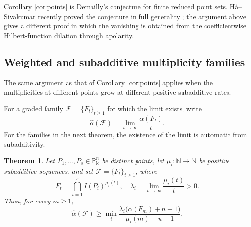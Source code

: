 \documentclass[11pt]{amsart}
\newtheorem{theorem}{Theorem}[section]
\theoremstyle{remark}
\newcommand{\PP}{\mathbb P}
\newcommand{\kk}{\Bbbk}
\newcommand{\NN}{\mathbb N}
\begin{document}
Corollary \ref{cor:points} is Demailly's conjecture for finite reduced point sets. H\`a--Sivakumar recently proved the conjecture in full generality \cite[Theorem~1.2]{HaSivakumar}; the argument above gives a different proof in which the vanishing is obtained from the coefficientwise Hilbert-function dilation through apolarity.

\subsection{Weighted and subadditive multiplicity families}

The same argument as that of Corollary \ref{cor:points} applies when the multiplicities at different points grow at different positive subadditive rates.

For a graded family $\mathcal F=\{F_t\}_{t\ge1}$ for which the limit exists, write
$$
\widehat\alpha(\mathcal F)=\lim_{t\to\infty}\frac{\alpha(F_t)}{t}.
$$
For the families in the next theorem, the existence of the limit is automatic from subadditivity.

\begin{theorem}\label{thm:main}
Let $P_1,\ldots,P_s\in\PP_\kk^n$ be distinct points, let $\mu_i:\NN\to\NN$ be positive subadditive sequences, and set $\mathcal F=\{F_t\}_{t\ge1}$, where
$$
F_t=\bigcap_{i=1}^s I(P_i)^{\mu_i(t)},
\quad
\lambda_i=\lim_{t\to\infty}\frac{\mu_i(t)}t>0.
$$
Then, for every $m\ge1$,
$$
\widehat\alpha(\mathcal F)
\ge
\min_i
\frac{\lambda_i\bigl(\alpha(F_m)+n-1\bigr)}{\mu_i(m)+n-1}.
$$
\end{theorem}
\end{document}
